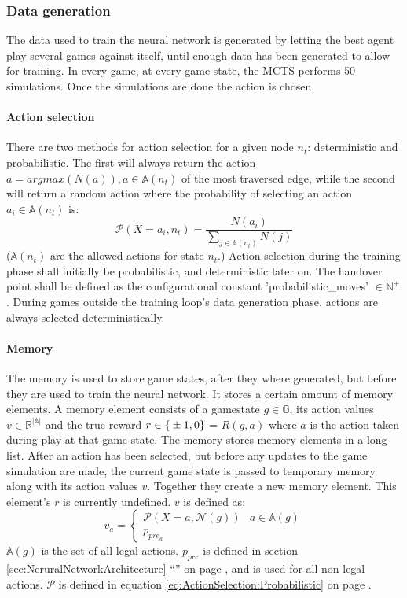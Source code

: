 \documentclass[12pt]{article}
\newcommand{\equationref}[1]{equation \ref{#1} on page \pageref{#1}}
\newcommand{\sectionref}[1]{section \ref{#1} ``\nameref{#1}'' on page \pageref{#1}}
\begin{document}
\subsubsection{Data generation}
The data used to train the neural network is generated by letting the best agent play several games against itself, until enough data has been generated to allow for training. In every game, at every game state, the MCTS performs 50 simulations. Once the simulations are done the action is chosen.
\paragraph{Action selection}\label{sec:training:actionSelection}
There are two methods for action selection for a given node \(n_t\): deterministic and probabilistic. The first will always return the action \(a = argmax(N(a)), a\in\mathbb A(n_t)\) of the most traversed edge, while the second will return a random action where the probability of selecting an action \(a_i \in \mathbb A(n_t)\) is:
\begin{equation} \label{eq:ActionSelection:Probabilistic}
\mathcal P(X=a_i, n_t) = \frac{N(a_i)}{\sum_{j \in \mathbb A(n_t)} N(j)}
\end{equation}
(\(\mathbb A(n_t)\) are the allowed actions for state \(n_t\).) Action selection during the training phase shall initially be probabilistic, and deterministic later on. The handover point shall be defined as the configurational constant 'probabilistic\_moves' \(\in \mathbb N^+\). During games outside the training loop's data generation phase, actions are always selected deterministically.
 \paragraph{Memory}
\label{sec:memory}
The memory is used to store game states, after they where generated, but before they are used to train the neural network.
It stores a certain amount of memory elements. A memory element consists of a gamestate \(g \in \mathbb G\), its action values \(v \in \mathbb R^{|\mathbb A|}\) and the true reward \(r \in \mathbb \{\pm1, 0\}\) = \(R(g, a)\) where \(a\) is the action taken during play at that game state. The memory stores memory elements in a long list. After an action has been selected, but before any updates to the game simulation are made, the current game state is passed to temporary memory along with its action values \(v\). Together they create a new memory element. This element's \(r\) is currently undefined. \(v\) is defined as: 
\begin{equation} \label{eq:Memory:ActionValuesDefinition}
v_a = 
\begin{cases}
\mathcal P(X=a, \mathcal N(g)) & a \in \mathbb A(g)\\
p_{pre_a} &
\end{cases}
\end{equation}
\(\mathbb A(g)\) is the set of all legal actions. \(p_{pre}\) is defined in \sectionref{sec:NeruralNetworkArchitecture}, and is used for all non legal actions. \(\mathcal P\) is defined in \equationref{eq:ActionSelection:Probabilistic}.
\end{document}
